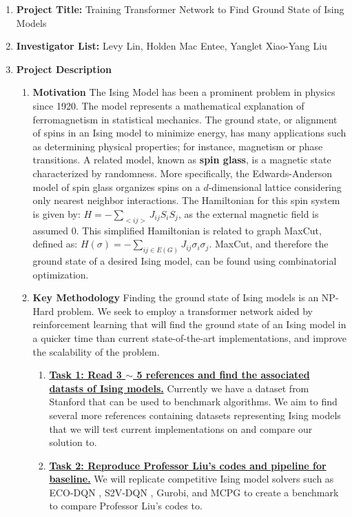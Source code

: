 \documentclass{article}
\begin{document}
\begin{enumerate}
\item \textbf{Project Title:} Training Transformer Network to Find Ground State of Ising Models

\item \textbf{Investigator List:} Levy Lin, Holden Mac Entee, Yanglet Xiao-Yang Liu

\item \textbf{Project Description}
\begin{enumerate}
	\item \textbf{Motivation}
	\newline
	The Ising Model has been a prominent problem in physics since 1920. The model represents a mathematical explanation of ferromagnetism in statistical mechanics. The ground state, or alignment of spins in an Ising model to minimize energy, has many applications such as determining physical properties; for instance, magnetism or phase transitions. A related model, known as \textbf{spin glass}, is a magnetic state characterized by randomness. More specifically, the Edwards-Anderson model of spin glass organizes spins on a $d$-dimensional lattice considering only nearest neighbor interactions. The Hamiltonian for this spin system is given by: $H = - \sum_{<ij>}J_{ij}S_iS_j$, as the external magnetic field is assumed 0. This simplified Hamiltonian is related to graph MaxCut, defined as: $H(\sigma) = - \sum_{ij\in E(G)}J_{ij}\sigma_i\sigma_j$. MaxCut, and therefore the ground state of a desired Ising model, can be found using combinatorial optimization.

	\item \textbf{Key Methodology}
	\newline
		Finding the ground state of Ising models is an NP-Hard problem. We seek to employ a transformer network aided by reinforcement learning that will find the ground state of an Ising model in a quicker time than current state-of-the-art implementations, and improve the scalability of the problem.
	\begin{enumerate}
			
		\item \textbf{\underline{Task 1: Read 3 $\sim$ 5 references and find the associated datasts of Ising models.}}
		\newline Currently we have a dataset from Stanford that can be used to benchmark algorithms. We aim to find several more references containing datasets representing Ising models that we will test current implementations on and compare our solution to.
		\item \textbf{\underline{Task 2: Reproduce Professor Liu's codes and pipeline for baseline.}}  We will replicate competitive Ising model solvers such as ECO-DQN \cite{b6}, S2V-DQN \cite{b7}, Gurobi, and MCPG to create a benchmark to compare Professor Liu's codes to.


\end{enumerate}
\end{enumerate}
\end{enumerate}
\end{document}
